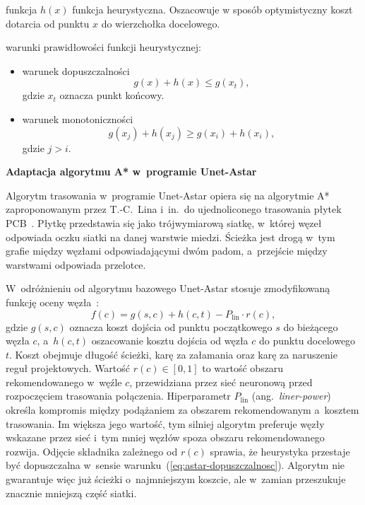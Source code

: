 funkcja $h(x)$ funkcja heurystyczna. Oszacowuje w sposób optymistyczny koszt dotarcia od punktu $x$
do wierzchołka docelowego.

warunki prawidłowości funkcji heurystycznej:

\begin{itemize}
  \item warunek dopuszczalności
    \begin{equation}
      g(x) + h(x) \le g(x_t),
      \label{eq:astar-dopuszczalnosc}
    \end{equation}
    gdzie $x_t$ oznacza punkt końcowy.
  \item warunek monotoniczności
    \begin{equation}
      g(x_j) + h(x_j) \ge g(x_i) + h(x_i),
      \label{eq:astar-monotonicznosc}
    \end{equation}
  gdzie $j > i$.
\end{itemize}
\textbf{Adaptacja algorytmu A* w~programie Unet-Astar}
\label{sec:astar-unet}

Algorytm trasowania w~programie Unet-Astar opiera się na algorytmie A*
zaproponowanym przez T.-C.~Lina i~in.\ do ujednoliconego trasowania płytek
PCB~\cite{Lin2021UnifiedPCB,Yin2023UnetAstar}. Płytkę przedstawia się jako
trójwymiarową siatkę, w~której węzeł odpowiada oczku siatki na danej
warstwie miedzi. Ścieżka jest drogą w~tym grafie między węzłami
odpowiadającymi dwóm padom, a~przejście między warstwami odpowiada
przelotce.

W~odróżnieniu od algorytmu bazowego Unet-Astar stosuje zmodyfikowaną funkcję
oceny węzła~\cite{Yin2023UnetAstar}:
\begin{equation}
  f(c) = g(s, c) + h(c, t) - P_{\mathrm{lin}} \cdot r(c),
  \label{eq:unet-astar-koszt}
\end{equation}
gdzie $g(s,c)$ oznacza koszt dojścia od punktu początkowego $s$ do bieżącego
węzła $c$, a~$h(c,t)$ oszacowanie kosztu dojścia od węzła $c$ do punktu
docelowego $t$. Koszt obejmuje długość ścieżki, karę za załamania
oraz karę za naruszenie reguł projektowych. Wartość $r(c) \in [0,1]$ to
wartość obszaru rekomendowanego w~węźle $c$, przewidziana przez sieć
neuronową przed rozpoczęciem trasowania połączenia. Hiperparametr
$P_{\mathrm{lin}}$ (ang.~\emph{liner-power}) określa kompromis między
podążaniem za obszarem rekomendowanym a~kosztem trasowania. Im większa jego
wartość, tym silniej algorytm preferuje węzły wskazane przez sieć i~tym
mniej węzłów spoza obszaru rekomendowanego rozwija. Odjęcie składnika
zależnego od $r(c)$ sprawia, że heurystyka przestaje być dopuszczalna
w~sensie warunku~(\ref{eq:astar-dopuszczalnosc}). Algorytm nie gwarantuje
więc już ścieżki o~najmniejszym koszcie, ale w~zamian przeszukuje znacznie
mniejszą część siatki.

